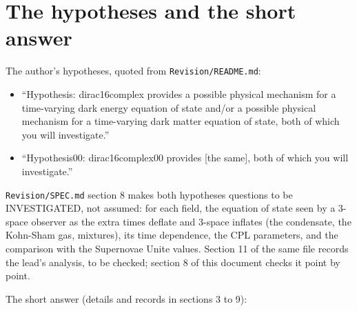 \documentclass[11pt]{article}
\begin{document}
\section{The hypotheses and the short answer}

The author's hypotheses, quoted from \texttt{Revision\allowbreak{}/README.\allowbreak{}md}:

\begin{itemize}
\item ``Hypothesis: dirac16complex provides a possible physical mechanism for a time-varying dark energy equation of state and/or a possible physical mechanism for a time-varying dark matter equation of state, both of which you will investigate.''
\item ``Hypothesis00: dirac16complex00 provides [the same], both of which you will investigate.''
\end{itemize}

\texttt{Revision\allowbreak{}/SPEC.md} section 8 makes both hypotheses questions to be INVESTIGATED, not assumed: for each field, the equation of state seen by a 3-space observer as the extra times deflate and 3-space inflates (the condensate, the Kohn-Sham gas, mixtures), its time dependence, the CPL parameters, and the comparison with the Supernovae Unite values. Section 11 of the same file records the lead's analysis, to be checked; section 8 of this document checks it point by point.

The short answer (details and records in sections 3 to 9):
\end{document}
